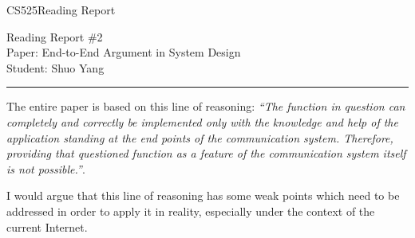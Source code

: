 \documentclass[11pt]{article}
\def\CourseCode{CS525}
\def\ReportNo{2}
\def\Category{Reading Report}
\def\PaperTitle{End-to-End Argument in System Design}
\def\Author{Shuo Yang}
\begin{document}
\noindent

\CourseCode \hfill \Category

\begin{center}
Reading Report \#\ReportNo\\
Paper: \PaperTitle\\
Student: \Author\\
\end{center}

\hrule\smallskip
\vspace{1.5em}

The entire paper is based on this line of reasoning: \emph{``The function in
question can completely and correctly be implemented only with the
knowledge and help of the application standing at the end points of
the communication system. Therefore, providing that questioned
function as a feature of the communication system itself is not
possible.''}.

I would argue that this line of reasoning has some weak points which
need to be addressed in order to apply it in reality, especially under
the context of the current Internet.
\end{document}
